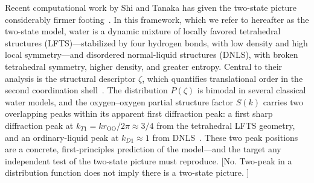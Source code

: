\documentclass[aps, amsmath,amssymb, reprint, twocolumn, superscriptaddress]{revtex4-2}
\newcommand{\comment}[1]{\textcolor{Mahogany}{#1}}
\begin{document}
Recent computational work by Shi and Tanaka has given the two-state picture considerably firmer footing~\cite{shi_direct_2020,russo_understanding_2014,shi_microscopic_2018}. In this framework, which we refer to hereafter as the two-state model, water is a dynamic mixture of locally favored tetrahedral structures (LFTS)---stabilized by four hydrogen bonds, with low density and high local symmetry---and disordered normal-liquid structures (DNLS), with broken tetrahedral symmetry, higher density, and greater entropy. Central to their analysis is the
structural descriptor $\zeta$, which quantifies translational order in the second coordination shell~\cite{russo_understanding_2014}. The distribution $P(\zeta)$ is bimodal in several classical water models, and the
oxygen--oxygen partial structure factor $S(k)$ carries two overlapping peaks within its apparent first diffraction peak: a first sharp diffraction peak at $k_{T1} = k r_{\mathrm{OO}}/2\pi \approx 3/4$ from the tetrahedral
LFTS geometry, and an ordinary-liquid peak at $k_{D1} \approx 1$ from DNLS~\cite{shi_direct_2020,shi-2019}. These two peak positions are a concrete, first-principles prediction of the model---and the target any independent
test of the two-state picture must reproduce. \comment{[No. Two-peak in a distribution function does not imply there is a two-state picture. ]}
\end{document}
